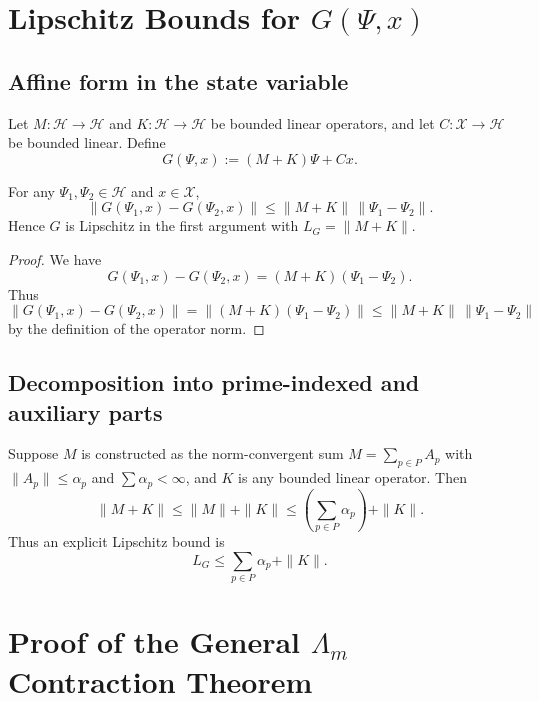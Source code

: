 \documentclass[11pt]{article}
\begin{document}
\section{Lipschitz Bounds for $G(\Psi,x)$}

\subsection{Affine form in the state variable}

Let $M : \mathcal{H} \to \mathcal{H}$ and $K : \mathcal{H} \to \mathcal{H}$ be bounded linear operators, and let $C : \mathcal{X} \to \mathcal{H}$ be bounded linear. Define
\begin{equation}
  G(\Psi,x) := (M+K)\Psi + Cx.
\end{equation}

\begin{lemma}
For any $\Psi_1,\Psi_2 \in \mathcal{H}$ and $x \in \mathcal{X}$,
\[
  \|G(\Psi_1,x) - G(\Psi_2,x)\|
  \leq
  \|M+K\|\,\|\Psi_1 - \Psi_2\|.
\]
Hence $G$ is Lipschitz in the first argument with $L_G = \|M+K\|$.
\end{lemma}

\begin{proof}
We have
\[
  G(\Psi_1,x) - G(\Psi_2,x)
  =
  (M+K)(\Psi_1 - \Psi_2).
\]
Thus
\[
  \|G(\Psi_1,x) - G(\Psi_2,x)\|
  =
  \|(M+K)(\Psi_1 - \Psi_2)\|
  \leq
  \|M+K\|\,\|\Psi_1 - \Psi_2\|
\]
by the definition of the operator norm.
\end{proof}

\subsection{Decomposition into prime-indexed and auxiliary parts}

Suppose $M$ is constructed as the norm-convergent sum $M = \sum_{p \in P} A_p$ with $\|A_p\| \leq \alpha_p$ and $\sum\alpha_p < \infty$, and $K$ is any bounded linear operator. Then
\[
  \|M+K\| \leq \|M\| + \|K\| \leq \left( \sum_{p \in P} \alpha_p \right) + \|K\|.
\]
Thus an explicit Lipschitz bound is
\begin{equation}
  L_G \leq \sum_{p \in P} \alpha_p + \|K\|.
\end{equation}

\section{Proof of the General $\Lambda_m$ Contraction Theorem}
\end{document}

